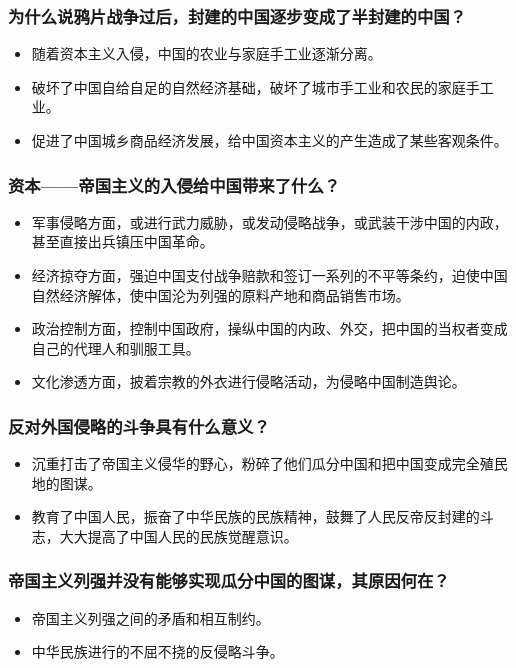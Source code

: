 \documentclass{article}
\begin{document}
\subsubsection{为什么说鸦片战争过后，封建的中国逐步变成了半封建的中国？}
\begin{itemize}
    \item 随着资本主义入侵，中国的农业与家庭手工业逐渐分离。
    \item 破坏了中国自给自足的自然经济基础，破坏了城市手工业和农民的家庭手工业。
    \item 促进了中国城乡商品经济发展，给中国资本主义的产生造成了某些客观条件。
\end{itemize}

\subsubsection{资本——帝国主义的入侵给中国带来了什么？}
\begin{itemize}
    \item 军事侵略方面，或进行武力威胁，或发动侵略战争，或武装干涉中国的内政，甚至直接出兵镇压中国革命。
    \item 经济掠夺方面，强迫中国支付战争赔款和签订一系列的不平等条约，迫使中国自然经济解体，使中国沦为列强的原料产地和商品销售市场。
    \item 政治控制方面，控制中国政府，操纵中国的内政、外交，把中国的当权者变成自己的代理人和驯服工具。
    \item 文化渗透方面，披着宗教的外衣进行侵略活动，为侵略中国制造舆论。
\end{itemize}

\subsubsection{反对外国侵略的斗争具有什么意义？}
\begin{itemize}
    \item 沉重打击了帝国主义侵华的野心，粉碎了他们瓜分中国和把中国变成完全殖民地的图谋。
    \item 教育了中国人民，振奋了中华民族的民族精神，鼓舞了人民反帝反封建的斗志，大大提高了中国人民的民族觉醒意识。
\end{itemize}

\subsubsection{帝国主义列强并没有能够实现瓜分中国的图谋，其原因何在？}
\begin{itemize}
    \item 帝国主义列强之间的矛盾和相互制约。
    \item 中华民族进行的不屈不挠的反侵略斗争。
\end{itemize}
\end{document}
